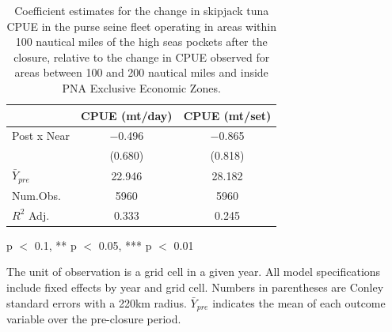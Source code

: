 \begin{table}
\centering
\begin{threeparttable}
\caption{\label{tab:h3}Coefficient estimates for the change in skipjack tuna CPUE in the purse seine fleet operating
             in areas within 100 nautical miles of the high seas pockets after the closure, relative to the change in CPUE
             observed for areas between 100 and 200 nautical miles and inside PNA Exclusive Economic Zones.}
\centering
\begin{tabular}[t]{lcc}
\toprule
  & CPUE (mt/day) & CPUE (mt/set)\\
\midrule
Post x Near & \num{-0.496} & \num{-0.865}\\
 & (\num{0.680}) & (\num{0.818})\\
$\bar{Y}_{pre}$ & \num{22.946} & \num{28.182}\\
\midrule
Num.Obs. & \num{5960} & \num{5960}\\
$R^2$ Adj. & \num{0.333} & \num{0.245}\\
\bottomrule
\end{tabular}
\begin{tablenotes}
\small
\item * p $<$ 0.1, ** p $<$ 0.05, *** p $<$ 0.01
\item The unit of observation is a grid cell in a given year. All model specifications include fixed effects by year and grid cell. Numbers in parentheses are Conley standard errors with a 220km radius. $\bar{Y}_{pre}$ indicates the mean of each outcome variable over the pre-closure period.
\end{tablenotes}
\end{threeparttable}
\end{table}
